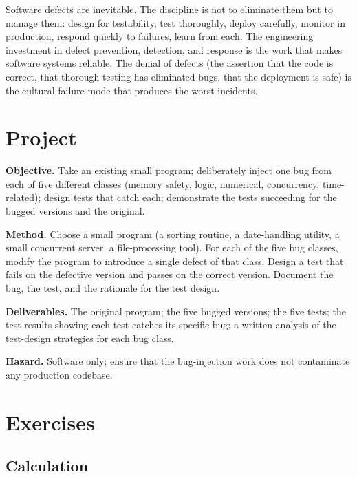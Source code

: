 \begin{principle}
Software defects are inevitable. The discipline is not to eliminate them but to manage them: design for testability, test thoroughly, deploy carefully, monitor in production, respond quickly to failures, learn from each. The engineering investment in defect prevention, detection, and response is the work that makes software systems reliable. The denial of defects (the assertion that the code is correct, that thorough testing has eliminated bugs, that the deployment is safe) is the cultural failure mode that produces the worst incidents.
\end{principle}

\section{Project}

\begin{project}
\textbf{Objective.} Take an existing small program; deliberately inject one bug from each of five different classes (memory safety, logic, numerical, concurrency, time-related); design tests that catch each; demonstrate the tests succeeding for the bugged versions and the original.

\textbf{Method.} Choose a small program (a sorting routine, a date-handling utility, a small concurrent server, a file-processing tool). For each of the five bug classes, modify the program to introduce a single defect of that class. Design a test that fails on the defective version and passes on the correct version. Document the bug, the test, and the rationale for the test design.

\textbf{Deliverables.} The original program; the five bugged versions; the five tests; the test results showing each test catches its specific bug; a written analysis of the test-design strategies for each bug class.

\textbf{Hazard.} Software only; ensure that the bug-injection work does not contaminate any production codebase.
\end{project}

\section{Exercises}

\subsection*{Calculation}

